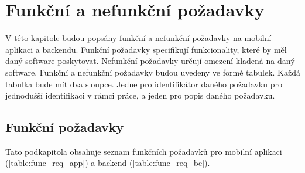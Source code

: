\chapter{Funkční a nefunkční požadavky}

\setcounter{page}{1}

\begin{chapterabstract}
V této kapitole budou popsány funkční a nefunkční požadavky na mobilní aplikaci a backendu. Funkční požadavky specifikují funkcionality, které by měl daný software poskytovat. Nefunkční požadavky určují omezení kladená na daný software. Funkční a nefunkční požadavky budou uvedeny ve formě tabulek. Každá tabulka bude mít dva sloupce. Jedne pro identifikátor daného požadavku pro jednodušší identifikaci v rámci práce, a jeden pro popis daného požadavku.
\end{chapterabstract}

\section{Funkční požadavky}
Tato podkapitola obsahuje seznam funkčních požadavků pro mobilní aplikaci (\ref{table:func_req_app}) a backend (\ref{table:func_req_be}).

